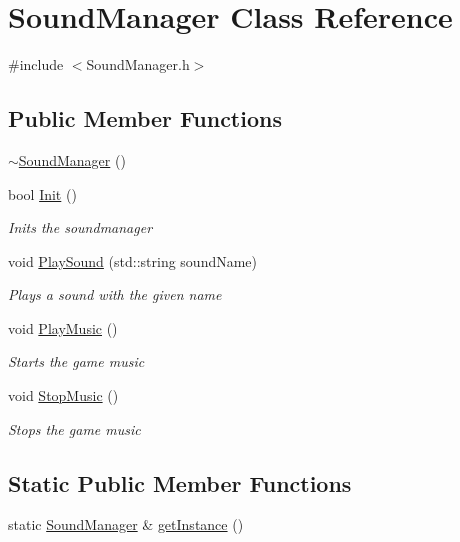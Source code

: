 \hypertarget{class_sound_manager}{}\section{Sound\+Manager Class Reference}
\label{class_sound_manager}


{\ttfamily \#include $<$Sound\+Manager.\+h$>$}

\subsection*{Public Member Functions}
\begin{DoxyCompactItemize}
\item 
\mbox{\hyperlink{class_sound_manager_ad5dbf8eab22db48ff8f3db51b02f8938}{$\sim$\+Sound\+Manager}} ()
\item 
bool \mbox{\hyperlink{class_sound_manager_af1ee5e29fca894a8ac9aeeb56b81f21d}{Init}} ()
\begin{DoxyCompactList}\small\item\em Inits the soundmanager \end{DoxyCompactList}\item 
void \mbox{\hyperlink{class_sound_manager_af84f2acbde4d8c0d8f5b47c2d917e486}{Play\+Sound}} (std\+::string sound\+Name)
\begin{DoxyCompactList}\small\item\em Plays a sound with the given name \end{DoxyCompactList}\item 
void \mbox{\hyperlink{class_sound_manager_ab4f6bc3b9c203232424b10da9912cf1b}{Play\+Music}} ()
\begin{DoxyCompactList}\small\item\em Starts the game music \end{DoxyCompactList}\item 
void \mbox{\hyperlink{class_sound_manager_a8b26fc4974bebd09b4bd7e108e8394ae}{Stop\+Music}} ()
\begin{DoxyCompactList}\small\item\em Stops the game music \end{DoxyCompactList}\end{DoxyCompactItemize}
\subsection*{Static Public Member Functions}
\begin{DoxyCompactItemize}
\item 
static \mbox{\hyperlink{class_sound_manager}{Sound\+Manager}} \& \mbox{\hyperlink{class_sound_manager_a4f8f0b2d539d055f4c1de8c47d483cb3}{get\+Instance}} ()
\end{DoxyCompactItemize}


